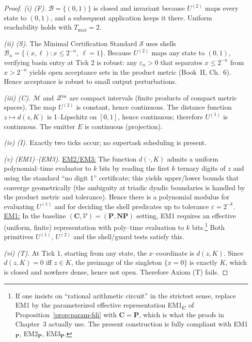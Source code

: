 \documentclass[12pt]{article}
\theoremstyle{definition}
\theoremstyle{plain}
\begin{document}
\begin{proof}
\emph{(i) (F).}
\(\mathcal B=\{(0,1)\}\) is closed and invariant because \(U^{(2)}\) maps every state to \((0,1)\), and a subsequent application keeps it there. Uniform reachability holds with \(T_{\max}=2\).

\emph{(ii) (S).}
The Minimal Certification Standard \(\mathcal S\) uses shells \(\mathcal B_n=\{(x,\ell):x\le2^{-n},\ \ell=1\}\). Because \(U^{(2)}\) maps any state to \((0,1)\), verifying basin entry at Tick 2 is robust: any \(\varepsilon_n>0\) that separates \(x\le 2^{-n}\) from \(x> 2^{-n}\) yields open acceptance sets in the product metric (Book~II, Ch.~6). Hence acceptance is robust to small output perturbations.

\emph{(iii) (C).}
\(\mathcal M\) and \(\mathcal Z^{\rm in}\) are compact intervals (finite products of compact metric spaces).
The map \(U^{(2)}\) is constant, hence continuous. The distance function \(z\mapsto d(z,K)\) is 1–Lipschitz on \([0,1]\), hence continuous; therefore \(U^{(1)}\) is continuous. The emitter \(E\) is continuous (projection).

\emph{(iv) (I).}
Exactly two ticks occur; no supertask scheduling is present.

\emph{(v) (EM1)–(EM3).}
\underline{EM2/EM3:}
The function \(d(\cdot,K)\) admits a uniform polynomial–time evaluator to \(k\) bits by reading the first \(k\) ternary digits of \(z\) and using the standard “no digit 1” certificate; this yields upper/lower bounds that converge geometrically (the ambiguity at triadic dyadic boundaries is handled by the product metric and tolerance). Hence there is a polynomial modulus for evaluating \(U^{(1)}\) and for deciding the shell predicates up to tolerance \(\varepsilon=2^{-k}\).
\underline{EM1:}
In the baseline \((\mathbf C,\mathcal V)=(\mathbf P,\mathbf{NP})\) setting, EM1 requires an effective (uniform, finite) representation with poly–time evaluation to \(k\) bits.\footnote{If one insists on “rational arithmetic circuit” in the strictest sense, replace EM1 by the parameterized effective representation EM1\(_{\mathbf C}\) of Proposition~\ref{prop:param-fdi} with \(\mathbf C=\mathbf P\), which is what the proofs in Chapter~3 actually use. The present construction is fully compliant with EM1\(_{\mathbf P}\), EM2\(_{\mathbf P}\), EM3\(_{\mathbf P}\).}
Both primitives \(U^{(1)}\), \(U^{(2)}\) and the shell/guard tests satisfy this.

\emph{(vi) (T).}
At Tick 1, starting from any state, the \(x\)–coordinate is \(d(z,K)\). Since \(d(z,K)=0\) iff \(z\in K\), the preimage of the singleton \(\{x=0\}\) is exactly \(K\), which is closed and nowhere dense, hence not open. Therefore Axiom (T) fails.
\end{proof}
\end{document}
